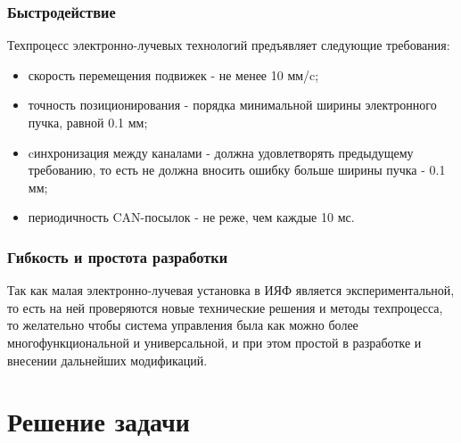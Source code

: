 \documentclass[14pt,russian,a4paper]{extarticle}
\begin{document}
\subsubsection{Быстродействие}
Техпроцесс электронно-лучевых технологий предъявляет следующие требования:
\begin{itemize}
    \item скорость перемещения подвижек - не менее 10 мм/c;
    \item точность позиционирования - порядка минимальной ширины электронного пучка, равной 0.1 мм;
    \item cинхронизация между каналами - должна удовлетворять предыдущему требованию, то есть не должна вносить ошибку больше ширины пучка - 0.1 мм;
    \item периодичность CAN-посылок - не реже, чем каждые 10 мс.
\end{itemize}
\subsubsection{Гибкость и простота разработки}
Так как малая электронно-лучевая установка в ИЯФ является экспериментальной, то есть на ней проверяются новые технические решения и методы техпроцесса, то желательно чтобы система управления была как можно более многофункциональной и универсальной, и при этом простой в разработке и внесении дальнейших модификаций.

\section{Решение задачи}
\end{document}
